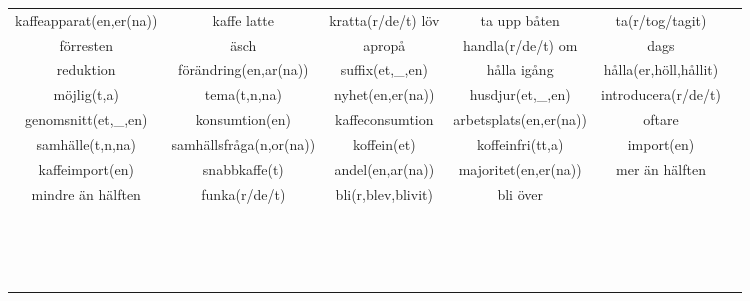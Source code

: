 
\begin{center}
    \begin{adjustwidth}{-2.4cm}{}
        \begin{tabular}{|c c c c c c|}
            \hline
            kaffeapparat(en,er(na)) & kaffe latte & kratta(r/de/t) löv & ta upp båten & ta(r/tog/tagit) &  \\
            förresten & äsch & apropå & handla(r/de/t) om & dags &  \\
            reduktion & förändring(en,ar(na)) & suffix(et,\_,en) & hålla igång & hålla(er,höll,hållit) &  \\
            möjlig(t,a) & tema(t,n,na) & nyhet(en,er(na)) & husdjur(et,\_,en) & introducera(r/de/t) &  \\
            genomsnitt(et,\_,en) & konsumtion(en) & kaffeconsumtion & arbetsplats(en,er(na)) & oftare &  \\
            samhälle(t,n,na) & samhällsfråga(n,or(na)) & koffein(et) & koffeinfri(tt,a) & import(en) &  \\
            kaffeimport(en) & snabbkaffe(t) & andel(en,ar(na)) & majoritet(en,er(na)) & mer än hälften &  \\
            mindre än hälften & funka(r/de/t) & bli(r,blev,blivit) & bli över &  &  \\
             &  &  &  &  &  \\
             &  &  &  &  &  \\
             &  &  &  &  &  \\
             &  &  &  &  &  \\
             &  &  &  &  &  \\
             &  &  &  &  &  \\
             &  &  &  &  &  \\
             &  &  &  &  &  \\
             &  &  &  &  &  \\
             &  &  &  &  &  \\
             &  &  &  &  &  \\
             &  &  &  &  &  \\
             &  &  &  &  &  \\
             &  &  &  &  &  \\
             &  &  &  &  &  \\
             &  &  &  &  &  \\

\end{tabular}
\end{adjustwidth}
\end{center}
